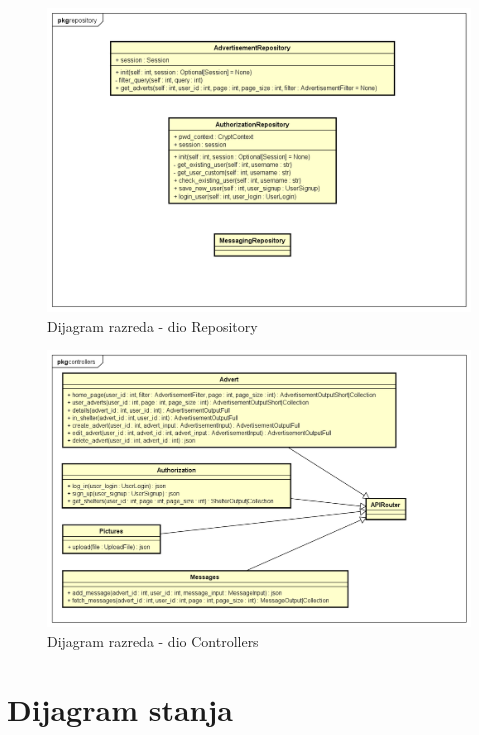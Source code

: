 			\begin{figure}[H]
				\includegraphics[scale=0.6]{dijagrami/dijagramiRazreda/repo.PNG} %
				\centering
				\caption{Dijagram razreda - dio Repository}
				\label{fig:drRepository}
			\end{figure}

			\begin{figure}[H]
				\includegraphics[scale=0.6]{dijagrami/dijagramiRazreda/Controllers.PNG} %
				\centering
				\caption{Dijagram razreda - dio Controllers}
				\label{fig:drControllers}
			\end{figure}
			
			\eject
		
		\section{Dijagram stanja}
			
